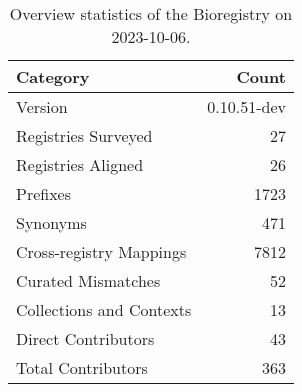 \begin{table}
\caption{Overview statistics of the Bioregistry on 2023-10-06.}
\label{tab:bioregistry-summary}
\begin{tabular}{lr}
\toprule
Category & Count \\
\midrule
Version & 0.10.51-dev \\
Registries Surveyed & 27 \\
Registries Aligned & 26 \\
Prefixes & 1723 \\
Synonyms & 471 \\
Cross-registry Mappings & 7812 \\
Curated Mismatches & 52 \\
Collections and Contexts & 13 \\
Direct Contributors & 43 \\
Total Contributors & 363 \\
\bottomrule
\end{tabular}
\end{table}
